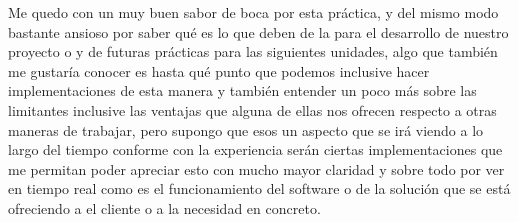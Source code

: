 \documentclass[10pt,a4paper]{article}
\begin{document}
Me quedo con un muy buen sabor de boca por esta práctica, y del mismo modo bastante ansioso por saber qué es lo que deben de la para el desarrollo de nuestro proyecto o y de futuras prácticas para las siguientes unidades, algo que también me gustaría conocer es hasta qué punto que podemos inclusive hacer implementaciones de esta manera y también entender un poco más sobre las limitantes inclusive las ventajas que alguna de ellas nos ofrecen respecto a otras maneras de trabajar, pero supongo que esos un aspecto que se irá viendo a lo largo del tiempo conforme con la experiencia serán ciertas implementaciones que me permitan poder apreciar esto con mucho mayor claridad y sobre todo por ver en tiempo real como es el funcionamiento del software o de la solución que se está ofreciendo a el cliente o a la necesidad en concreto.

\pagebreak


\section{\color{colorIPN}{Referencias Bibliográficas}}
\end{document}
